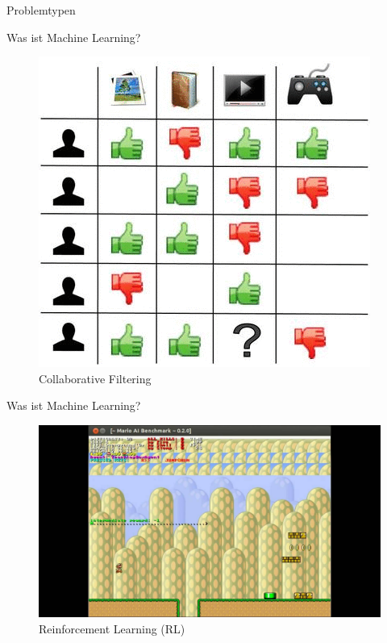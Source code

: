\documentclass{beamer}
\begin{document}
\begin{frame}{Problemtypen}
\begin{minipage}[b]{0.45\linewidth}
\begin{figure}
            \caption{}
            \label{fig:Klassifikation}
            \end{figure}
        \end{minipage}
\end{frame}


\begin{frame}{Was ist Machine Learning?}
    \begin{figure}
        \centering
        \includegraphics[width=\textwidth, height=0.8\textheight,keepaspectratio]{../images/collaborative-filtering.png}
        \caption{Collaborative Filtering}
    \end{figure}
\end{frame}


\begin{frame}{Was ist Machine Learning?}
    \begin{figure}
        \centering
        \includegraphics[width=\textwidth, height=0.8\textheight,keepaspectratio]{../images/rl.jpg}
        \caption{Reinforcement Learning (RL)}
    \end{figure}
\end{frame}
\end{document}
